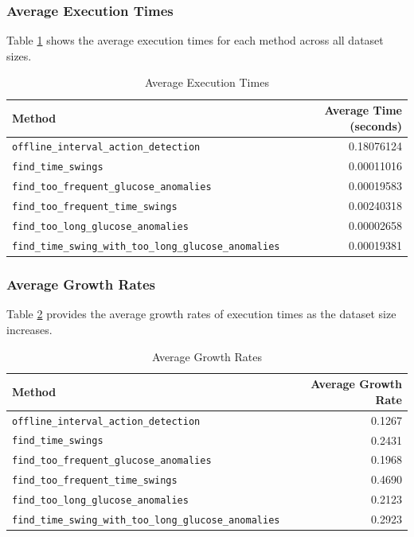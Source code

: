 \documentclass{article}
\begin{document}
\subsubsection{Average Execution Times}

Table \ref{tab:avg_execution_times} shows the average execution times for each method across all dataset sizes.

\begin{table}[h!]
\centering
\begin{tabular}{|l|r|}
\hline
\textbf{Method} & \textbf{Average Time (seconds)} \\
\hline
\texttt{offline\_interval\_action\_detection} & 0.18076124 \\
\texttt{find\_time\_swings} & 0.00011016 \\
\texttt{find\_too\_frequent\_glucose\_anomalies} & 0.00019583 \\
\texttt{find\_too\_frequent\_time\_swings} & 0.00240318 \\
\texttt{find\_too\_long\_glucose\_anomalies} & 0.00002658 \\
\texttt{find\_time\_swing\_with\_too\_long\_glucose\_anomalies} & 0.00019381 \\
\hline
\end{tabular}
\caption{Average Execution Times}
\label{tab:avg_execution_times}
\end{table}
\pagebreak
\subsubsection{Average Growth Rates}

Table \ref{tab:avg_growth_rates} provides the average growth rates of execution times as the dataset size increases.

\begin{table}[h!]
\centering
\begin{tabular}{|l|r|}
\hline
\textbf{Method} & \textbf{Average Growth Rate} \\
\hline
\texttt{offline\_interval\_action\_detection} & 0.1267 \\
\texttt{find\_time\_swings} & 0.2431 \\
\texttt{find\_too\_frequent\_glucose\_anomalies} & 0.1968 \\
\texttt{find\_too\_frequent\_time\_swings} & 0.4690 \\
\texttt{find\_too\_long\_glucose\_anomalies} & 0.2123 \\
\texttt{find\_time\_swing\_with\_too\_long\_glucose\_anomalies} & 0.2923 \\
\hline
\end{tabular}
\caption{Average Growth Rates}
\label{tab:avg_growth_rates}
\end{table}
\end{document}
